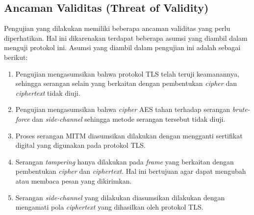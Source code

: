 \subsection{Ancaman Validitas (Threat of Validity)}

Pengujian yang dilakukan memiliki beberapa ancaman validitas yang perlu diperhatikan. Hal ini dikarenakan terdapat beberapa asumsi yang diambil dalam menguji protokol ini. Asumsi yang diambil dalam pengujian ini adalah sebagai berikut:
\begin{enumerate}
  \item Pengujian mengasumsikan bahwa protokol TLS telah teruji keamanannya, sehingga serangan selain yang berkaitan dengan pembentukan \emph{cipher} dan \emph{ciphertext} tidak diuji.
  \item Pengujian mengasumsikan bahwa \emph{cipher} AES tahan terhadap serangan \emph{brute-force} dan \emph{side-channel} sehingga metode serangan tersebut tidak diuji.
  \item Proses serangan MITM diasumsikan dilakukan dengan mengganti sertifikat digital yang digunakan pada protokol TLS.
  \item Serangan \emph{tampering} hanya dilakukan pada \emph{frame} yang berkaitan dengan pembentukan \emph{cipher} dan \emph{ciphertext}. Hal ini bertujuan agar dapat mengubah atau membaca pesan yang dikirimkan.
  \item Serangan \emph{side-channel} yang dilakukan diasumsikan dilakukan dengan mengamati pola \emph{ciphertext} yang dihasilkan oleh protokol TLS.
\end{enumerate}
